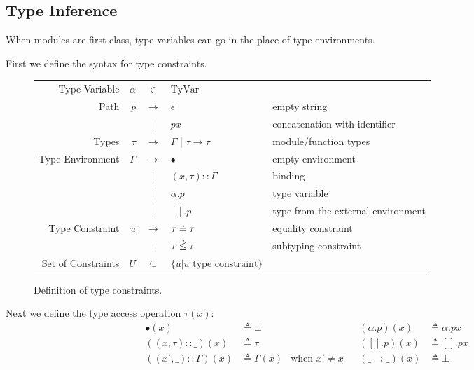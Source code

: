 \documentclass{article}
\theoremstyle{definition}
\newcommand*{\vbar}{|}
\newcommand*{\cons}{::}
\newcommand*{\A}[1]{\overset{\,_{\mbox{\Large .}}}{#1}}
\newcommand*{\TyVar}{\text{TyVar}}
\begin{document}
\subsection{Type Inference}

When modules are first-class, type variables can go in the place of type environments.

First we define the syntax for type constraints.
\begin{figure}[h!]
  \centering
  \begin{tabular}{rrcll}
    Type Variable      & $\alpha$ & $\in$         & $\TyVar$                                                              \\
    Path               & $p$      & $\rightarrow$ & $\epsilon$                       & empty string                       \\
                       &          & $\vbar$       & $p x$                            & concatenation with identifier      \\
    Types              & $\tau$   & $\rightarrow$ & $\Gamma$ | $\tau\rightarrow\tau$ & module/function types              \\
    Type Environment   & $\Gamma$ & $\rightarrow$ & $\bullet$                        & empty environment                  \\
                       &          & $\vbar$       & $(x,\tau)\cons \Gamma$           & binding                            \\
                       &          & $\vbar$       & $\alpha.p$                       & type variable                      \\
                       &          & $\vbar$       & $[].p$                           & type from the external environment \\
    Type Constraint    & $u$      & $\rightarrow$ & $\tau\A{=}\tau$                  & equality constraint                \\
                       &          & $\vbar$       & $\tau\A{\le}\tau$                & subtyping constraint               \\
    Set of Constraints & $U$      & $\subseteq$   & $\{u|u\text{ type constraint}\}$
  \end{tabular}
  \caption{Definition of type constraints.}
  \label{fig:typeqdom}
\end{figure}

Next we define the type access operation $\tau(x)$:
\begin{align*}
  \bullet(x)              & \triangleq\bot      &                      &  & (\alpha.p)(x)        & \triangleq\alpha.px \\
  ((x,\tau)\cons\_)(x)    & \triangleq\tau      &                      &  & ([].p)(x)            & \triangleq[].px     \\
  ((x',\_)\cons\Gamma)(x) & \triangleq\Gamma(x) & \text{when }x'\neq x &  & (\_\rightarrow\_)(x) & \triangleq\bot
\end{align*}
\end{document}
